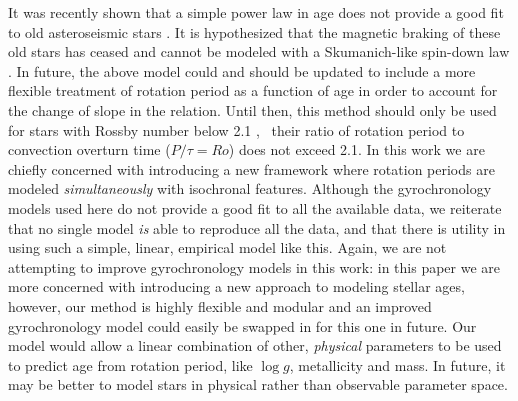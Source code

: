 It was recently shown that a simple power law in age does not provide a good
fit to old asteroseismic stars \citep{angus2015, vansaders2016}.
It is hypothesized that the magnetic braking of these old stars has ceased and
cannot be modeled with a Skumanich-like spin-down law \citep{vansaders2016}.
In future, the above model could and should be updated to include a more
flexible treatment of rotation period as a function of age in order to account
for the change of slope in the relation.
Until then, this method should only be used for stars with Rossby number below
2.1 \citep{vansaders2016}, \ie\ their ratio of rotation period to convection
overturn time ($P/\tau = Ro$) does not exceed 2.1.
In this work we are chiefly concerned with introducing a new framework where
rotation periods are modeled {\it simultaneously} with isochronal features.
Although the gyrochronology models used here do not provide a good fit to all
the available data, we reiterate that no single model {\it is} able to
reproduce all the data, and that there is utility in using such a simple,
linear, empirical model like this.
Again, we are not attempting to improve gyrochronology models in this work: in
this paper we are more concerned with introducing a new approach to modeling
stellar ages, however, our method is highly flexible and modular and an
improved gyrochronology model could easily be swapped in for this one in
future.
Our model would allow a linear combination of other, {\it physical} parameters
to be used to predict age from rotation period, like $\log g$, metallicity and
mass.
In future, it may be better to model stars in physical rather than observable
parameter space.


